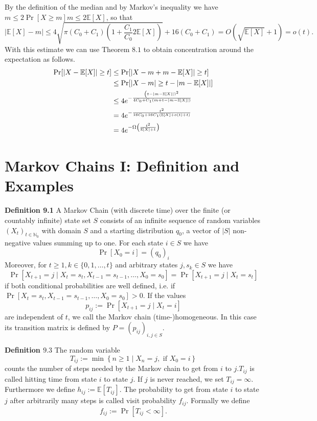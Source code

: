 By the definition of the median and by Markov's inequality we have $m \leq 2 \operatorname{Pr}[X \geq m] m \leq 2 \mathbb{E}[X]$, so that
$$
|\mathbb{E}[X]-m| \leq 4 \sqrt{\pi\left(C_{0}+C_{1}\right)\left(1+\frac{C_{1}}{C_{0}} 2 \mathbb{E}[X]\right)}+16\left(C_{0}+C_{1}\right)=O(\sqrt{\mathbb{E}[X]}+1)=o(t) .
$$
With this estimate we can use Theorem $8.1$ to obtain concentration around the expectation as follows.
$$
\begin{aligned}
\operatorname{Pr}[|X-\mathbb{E}[X]| \geq t] & \leq \operatorname{Pr}[|X-m+m-\mathbb{E}[X]| \geq t] \\
& \leq \operatorname{Pr}[|X-m| \geq t-|m-\mathbb{E}[X]|] \\
& \leq 4 e^{-\frac{\left(t-\mid m-\mathbb{E}[X||)^{2}\right.}{4 C_{0}+C_{1}(m+t-|m-\mathbb{E}[X]|)}} \\
&=4 e^{-\frac{t^2}{16 C_{0}+16C_1 (\mathbb{E}[X]+o(t)+t)}} \\
&=4 e^{-\Omega\left(\frac{t^{2}}{\mathbb{E}[X]+t}\right)}
\end{aligned}
$$

\section{ Markov Chains I: Definition and Examples}
\textbf{Definition 9.1} A Markov Chain (with discrete time) over the finite (or countably infinite) state set $S$ consists of an infinite sequence of random variables $\left(X_{t}\right)_{t \in \mathbb{N}_{0}}$ with domain $S$ and a starting distribution $q_{0}$, a vector of $|S|$ non-negative values summing up to one. For each state $i \in S$ we have
$$
\operatorname{Pr}\left[X_{0}=i\right]=\left(q_{0}\right)_{i}
$$
Moreover, for $t \geq 1, k \in\{0,1, \ldots, t\}$ and arbitrary states $j, s_{k} \in S$ we have
$$
\operatorname{Pr}\left[X_{t+1}=j \mid X_{t}=s_{t}, X_{t-1}=s_{t-1}, \ldots, X_{0}=s_{0}\right]=\operatorname{Pr}\left[X_{t+1}=j \mid X_{t}=s_{t}\right]
$$
if both conditional probabilities are well defined, i.e. if $\operatorname{Pr}\left[X_{t}=s_{t}, X_{t-1}=s_{t-1}, \ldots, X_{0}=s_{0}\right]>0 .$ If the values
$$
p_{i j}:=\operatorname{Pr}\left[X_{t+1}=j \mid X_{t}=i\right]
$$
are independent of $t$, we call the Markov chain (time-)homogeneous. In this case its transition matrix is defined by $P=\left(p_{i j}\right)_{i, j \in S}$.

\textbf{Definition $9.3$} The random variable
$$
T_{i j}:=\min \left\{n \geq 1 \mid X_{n}=j, \text { if } X_{0}=i\right\}
$$
counts the number of steps needed by the Markov chain to get from $i$ to $j . T_{i j}$ is called hitting time from state $i$ to state $j .$ If $j$ is never reached, we set $T_{i j}=\infty$. Furthermore we define $h_{i j}:=\mathbb{E}\left[T_{i j}\right]$.
The probability to get from state $i$ to state $j$ after arbitrarily many steps is called visit probability $f_{i j}$. Formally we define
$$
f_{i j}:=\operatorname{Pr}\left[T_{i j}<\infty\right] .
$$


